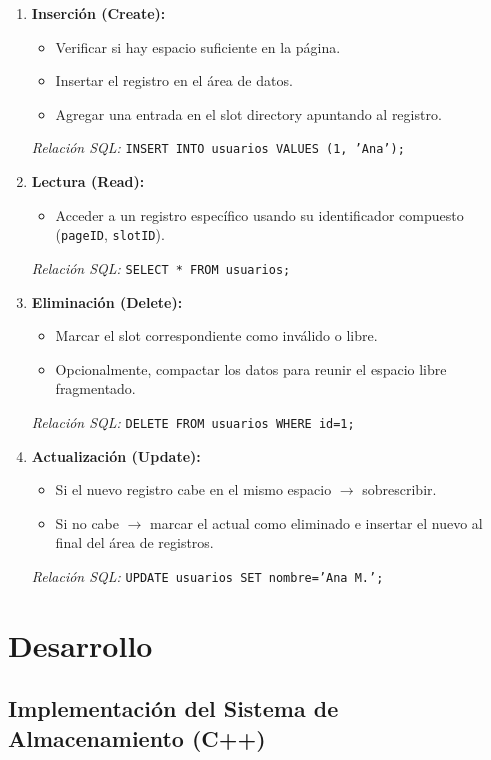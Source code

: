 \documentclass[12pt,a4paper]{article}
\begin{document}
\begin{enumerate}
    \item \textbf{Inserción (Create):}
    \begin{itemize}
        \item Verificar si hay espacio suficiente en la página.
        \item Insertar el registro en el área de datos.
        \item Agregar una entrada en el slot directory apuntando al registro.
    \end{itemize}
    \textit{Relación SQL:} \texttt{INSERT INTO usuarios VALUES (1, 'Ana');}
    
    \item \textbf{Lectura (Read):}
    \begin{itemize}
        \item Acceder a un registro específico usando su identificador compuesto (\texttt{pageID}, \texttt{slotID}).
    \end{itemize}
    \textit{Relación SQL:} \texttt{SELECT * FROM usuarios;}
    
    \item \textbf{Eliminación (Delete):}
    \begin{itemize}
        \item Marcar el slot correspondiente como inválido o libre.
        \item Opcionalmente, compactar los datos para reunir el espacio libre fragmentado.
    \end{itemize}
    \textit{Relación SQL:} \texttt{DELETE FROM usuarios WHERE id=1;}
    
    \item \textbf{Actualización (Update):}
    \begin{itemize}
        \item Si el nuevo registro cabe en el mismo espacio $\rightarrow$ sobrescribir.
        \item Si no cabe $\rightarrow$ marcar el actual como eliminado e insertar el nuevo al final del área de registros.
    \end{itemize}
    \textit{Relación SQL:} \texttt{UPDATE usuarios SET nombre='Ana M.';}
\end{enumerate}

\section{Desarrollo}

\subsection{Implementación del Sistema de Almacenamiento (C++)}
\end{document}
